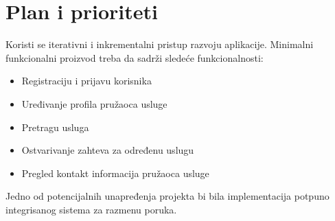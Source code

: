 \documentclass[a4paper,12pt]{report}
\begin{document}
\section{Plan i prioriteti}
Koristi se iterativni i inkrementalni pristup razvoju aplikacije. Minimalni funkcionalni proizvod treba da sadrži sledeće funkcionalnosti:
\begin{itemize}
        \item Registraciju i prijavu korisnika
        \item Uređivanje profila pružaoca usluge
        \item Pretragu usluga
        \item Ostvarivanje zahteva za određenu uslugu
        \item Pregled kontakt informacija pružaoca usluge
    \end{itemize}
    Jedno od potencijalnih unapređenja projekta bi bila implementacija potpuno integrisanog sistema za razmenu poruka.
\end{document}
